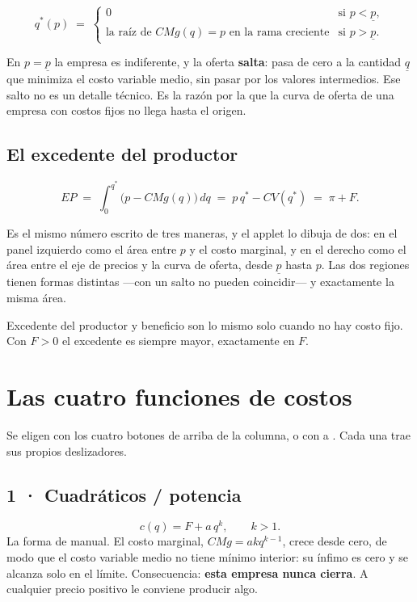 \documentclass[11pt,a4paper]{appletmanual}
\begin{document}
\[
  q^\ast(p) \;=\;
  \begin{cases}
    0 & \text{si } p < \underline{p},\\[2pt]
    \text{la raíz de } CMg(q) = p \text{ en la rama creciente} & \text{si } p > \underline{p}.
  \end{cases}
\]

En $p = \underline{p}$ la empresa es indiferente, y la oferta \textbf{salta}:
pasa de cero a la cantidad $\underline{q}$ que minimiza el costo variable
medio, sin pasar por los valores intermedios. Ese salto no es un detalle
técnico. Es la razón por la que la curva de oferta de una empresa con costos
fijos no llega hasta el origen.

\subsection{El excedente del productor}

\[
  EP \;=\; \int_0^{q^\ast}\!\bigl(p - CMg(q)\bigr)\,dq
       \;=\; p\,q^\ast - CV(q^\ast)
       \;=\; \pi + F.
\]

Es el mismo número escrito de tres maneras, y el applet lo dibuja de dos: en el
panel izquierdo como el área entre $p$ y el costo marginal, y en el derecho
como el área entre el eje de precios y la curva de oferta, desde
$\underline{p}$ hasta $p$. Las dos regiones tienen formas distintas —con un
salto no pueden coincidir— y exactamente la misma área.

\begin{amnote}
Excedente del productor y beneficio son lo mismo solo cuando no hay costo fijo.
Con $F > 0$ el excedente es siempre mayor, exactamente en $F$.
\end{amnote}

\section{Las cuatro funciones de costos}

Se eligen con los cuatro botones de arriba de la columna, o con  a
. Cada una trae sus propios deslizadores.

\subsection{1 · Cuadráticos / potencia}

\[
  c(q) = F + a\,q^{k}, \qquad k > 1.
\]
La forma de manual. El costo marginal, $CMg = a k q^{k-1}$, crece desde cero,
de modo que el costo variable medio no tiene mínimo interior: su ínfimo es cero
y se alcanza solo en el límite. Consecuencia: \textbf{esta empresa nunca
cierra}. A cualquier precio positivo le conviene producir algo.
\end{document}
